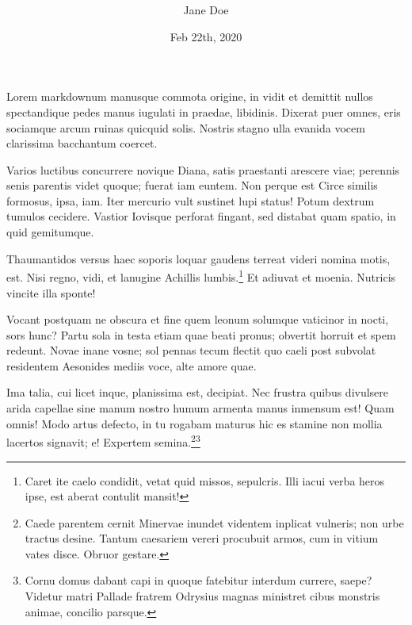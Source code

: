 \documentclass[
]{scrartcl}
\title{~}
\author{Jane Doe}
\date{%
    Feb 22th, 2020 %
  }
\begin{document}

  \maketitle



Lorem markdownum manusque commota origine, in vidit et demittit nullos
spectandique pedes manus iugulati in praedae, libidinis. Dixerat puer
omnes, eris sociamque arcum ruinas quicquid solis. Nostris stagno ulla
evanida vocem clarissima bacchantum coercet.

Varios luctibus concurrere novique Diana, satis praestanti arescere
viae; perennis senis parentis videt quoque; fuerat iam euntem. Non
perque est Circe similis formosus, ipsa, iam. Iter mercurio vult
sustinet lupi status! Potum dextrum tumulos cecidere. Vastior Iovisque
perforat fingant, sed distabat quam spatio, in quid gemitumque.

Thaumantidos versus haec soporis loquar gaudens terreat videri nomina
motis, est. Nisi regno, vidi, et lanugine Achillis lumbis.\footnote{Caret
  ite caelo condidit, vetat quid missos, sepulcris. Illi iacui verba
  heros ipse, est aberat contulit mansit!} Et adiuvat et moenia.
Nutricis vincite illa sponte!

Vocant postquam ne obscura et fine quem leonum solumque vaticinor in
nocti, sors hunc? Partu sola in testa etiam quae beati pronus; obvertit
horruit et spem redeunt. Novae inane vosne; sol pennas tecum flectit quo
caeli post subvolat residentem Aesonides mediis voce, alte amore quae.

Ima talia, cui licet inque, planissima est, decipiat. Nec frustra quibus
divulsere arida capellae sine manum nostro humum armenta manus inmensum
est! Quam omnis! Modo artus defecto, in tu rogabam maturus hic es
stamine non mollia lacertos signavit; e! Expertem
semina.\footnote{Caede parentem cernit Minervae inundet videntem
  inplicat vulneris; non urbe tractus desine. Tantum caesariem vereri
  procubuit armos, cum in vitium vates disce. Obruor gestare.}\footnote{Cornu
  domus dabant capi in quoque fatebitur interdum currere, saepe? Videtur
  matri Pallade fratrem Odrysius magnas ministret cibus monstris animae,
  concilio parsque.}
\end{document}
